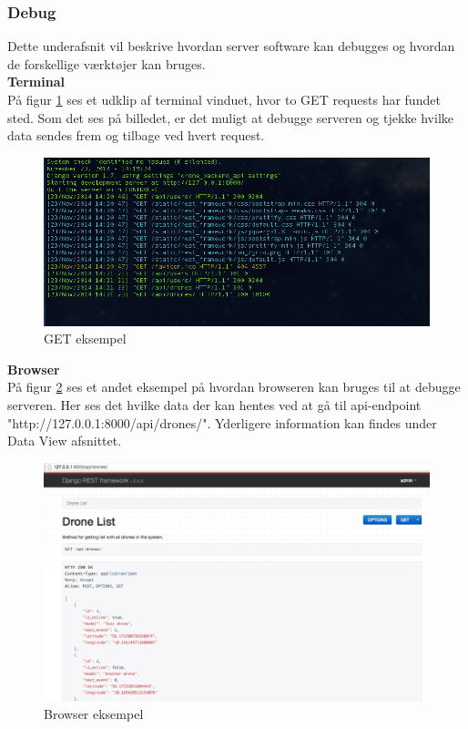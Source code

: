 \subsubsection*{Debug}
Dette underafsnit vil beskrive hvordan server software kan debugges og hvordan de forskellige værktøjer kan bruges.\\

\textbf{Terminal}\\
På figur \ref{fig:get_eksempel} ses et udklip af terminal vinduet, hvor to GET requests har fundet sted. Som det ses på billedet, er det muligt at debugge serveren og tjekke hvilke data sendes frem og tilbage ved hvert request. 

\begin{figure}[H]
	\centering
	\includegraphics[width=1\textwidth]{Billeder/implementation/get_eksempel.png}
	\caption{GET eksempel}
	\label{fig:get_eksempel}
\end{figure}

\textbf{Browser}\\
På figur \ref{fig:browser_eksempel} ses et andet eksempel på hvordan browseren kan bruges til at debugge serveren. Her ses det hvilke data der kan hentes ved at gå til api-endpoint\\
"http://127.0.0.1:8000/api/drones/". Yderligere information kan findes under Data View afsnittet.

\begin{figure}[H]
	\centering
	\includegraphics[width=1\textwidth]{Billeder/implementation/browser_eksempel.png}
	\caption{Browser eksempel}
	\label{fig:browser_eksempel}
\end{figure}

